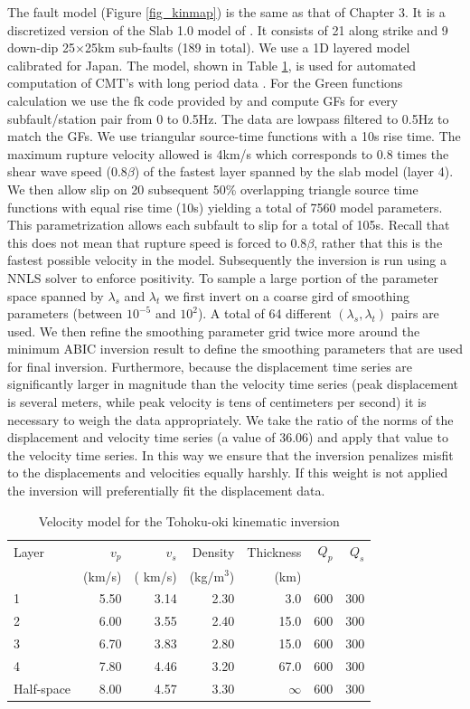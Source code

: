 The fault model (Figure \ref{fig_kinmap}) is the same as that of Chapter 3. It is a discretized version of the Slab 1.0 model of \citep{hayes2012}. It consists of 21 along strike and 9 down-dip 25$\times$25km sub-faults (189 in total). We use a 1D layered model calibrated for Japan. The model, shown in Table \ref{tb_toku_model}, is used for automated computation of CMT's with long period data \citep{fukuyama1998,tsuruoka2009}. For the Green functions calculation we use the fk code provided by \citep{zhu2002} and compute GFs for every subfault/station pair from 0 to 0.5Hz. The data are lowpass filtered to 0.5Hz to match the GFs. We use triangular source-time functions with a 10s rise time. The maximum rupture velocity allowed is 4km/s which corresponds to 0.8 times the shear wave speed ($0.8\beta$) of the fastest layer spanned by the slab model (layer 4). We then allow slip on 20 subsequent 50\% overlapping triangle source time functions with equal rise time (10s) yielding a total of 7560 model parameters. This parametrization allows each subfault to slip for a total of 105s. Recall that this does not mean that rupture speed is forced to 0.8$\beta$, rather that this is the fastest possible velocity in the model. Subsequently the inversion is run using a NNLS solver to enforce positivity. To sample a large portion of the parameter space spanned by $\lambda_s$ and $\lambda_t$ we first invert on a coarse gird of smoothing parameters (between $10^{-5}$ and $10^2$). A total of 64 different $(\lambda_s,\lambda_t)$ pairs are used. We then refine the smoothing parameter grid twice more around the minimum ABIC inversion result to define the smoothing parameters that are used for final inversion. Furthermore, because the displacement time series are significantly larger in magnitude than the velocity time series (peak displacement is several meters, while peak velocity is tens of centimeters per second) it is necessary to weigh the data appropriately. We take the ratio of the norms of the displacement and velocity time series (a value of 36.06) and apply that value to the velocity time series. In this way we ensure that the inversion penalizes misfit to the displacements and velocities equally harshly. If this weight is not applied the inversion will preferentially fit the displacement data.

\begin{table}
\caption{Velocity model for the Tohoku-oki kinematic inversion}
\label{tb_toku_model}
\begin{tabular}{l r r r r r r}
\hline
Layer & $v_p$ & $v_s$ &Density&Thickness&$Q_p$&$Q_s$\\
 & (km/s) &( km/s) & (kg/m$^{3}$) & (km) &  &\\
\hline
1 & 5.50 & 3.14 & 2.30 & 3.0 & 600 & 300\\
2 & 6.00 & 3.55 & 2.40 & 15.0 & 600 & 300\\
3 & 6.70 & 3.83 & 2.80 & 15.0 & 600 & 300\\
4 & 7.80 & 4.46 & 3.20 & 67.0 & 600 & 300\\
Half-space & 8.00 & 4.57 & 3.30 & $\infty$ & 600 & 300\\
\hline
\end{tabular}
\end{table}

